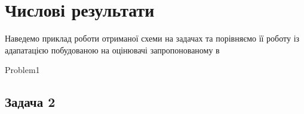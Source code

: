 
\section{Числові результати}

Наведемо приклад роботи отриманої схеми на  задачах та порівняємо
	її роботу із адапатацією побудованою на оцінювачі запропонованому в 

{Problem1}
\subsection{Задача 2}
